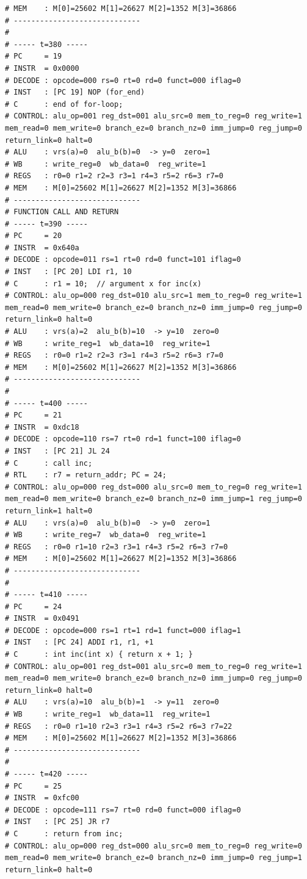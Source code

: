 \documentclass[12pt]{report}
\begin{document}
\begin{lstlisting}
# MEM    : M[0]=25602 M[1]=26627 M[2]=1352 M[3]=36866
# -----------------------------
# 
# ----- t=380 -----
# PC     = 19
# INSTR  = 0x0000
# DECODE : opcode=000 rs=0 rt=0 rd=0 funct=000 iflag=0
# INST   : [PC 19] NOP (for_end)
# C      : end of for-loop;
# CONTROL: alu_op=001 reg_dst=001 alu_src=0 mem_to_reg=0 reg_write=1 mem_read=0 mem_write=0 branch_ez=0 branch_nz=0 imm_jump=0 reg_jump=0 return_link=0 halt=0
# ALU    : vrs(a)=0  alu_b(b)=0  -> y=0  zero=1
# WB     : write_reg=0  wb_data=0  reg_write=1
# REGS   : r0=0 r1=2 r2=3 r3=1 r4=3 r5=2 r6=3 r7=0
# MEM    : M[0]=25602 M[1]=26627 M[2]=1352 M[3]=36866
# -----------------------------
# FUNCTION CALL AND RETURN
# ----- t=390 -----
# PC     = 20
# INSTR  = 0x640a
# DECODE : opcode=011 rs=1 rt=0 rd=0 funct=101 iflag=0
# INST   : [PC 20] LDI r1, 10
# C      : r1 = 10;  // argument x for inc(x)
# CONTROL: alu_op=000 reg_dst=010 alu_src=1 mem_to_reg=0 reg_write=1 mem_read=0 mem_write=0 branch_ez=0 branch_nz=0 imm_jump=0 reg_jump=0 return_link=0 halt=0
# ALU    : vrs(a)=2  alu_b(b)=10  -> y=10  zero=0
# WB     : write_reg=1  wb_data=10  reg_write=1
# REGS   : r0=0 r1=2 r2=3 r3=1 r4=3 r5=2 r6=3 r7=0
# MEM    : M[0]=25602 M[1]=26627 M[2]=1352 M[3]=36866
# -----------------------------
# 
# ----- t=400 -----
# PC     = 21
# INSTR  = 0xdc18
# DECODE : opcode=110 rs=7 rt=0 rd=1 funct=100 iflag=0
# INST   : [PC 21] JL 24
# C      : call inc;
# RTL    : r7 = return_addr; PC = 24;
# CONTROL: alu_op=000 reg_dst=000 alu_src=0 mem_to_reg=0 reg_write=1 mem_read=0 mem_write=0 branch_ez=0 branch_nz=0 imm_jump=1 reg_jump=0 return_link=1 halt=0
# ALU    : vrs(a)=0  alu_b(b)=0  -> y=0  zero=1
# WB     : write_reg=7  wb_data=0  reg_write=1
# REGS   : r0=0 r1=10 r2=3 r3=1 r4=3 r5=2 r6=3 r7=0
# MEM    : M[0]=25602 M[1]=26627 M[2]=1352 M[3]=36866
# -----------------------------
# 
# ----- t=410 -----
# PC     = 24
# INSTR  = 0x0491
# DECODE : opcode=000 rs=1 rt=1 rd=1 funct=000 iflag=1
# INST   : [PC 24] ADDI r1, r1, +1
# C      : int inc(int x) { return x + 1; }
# CONTROL: alu_op=001 reg_dst=001 alu_src=0 mem_to_reg=0 reg_write=1 mem_read=0 mem_write=0 branch_ez=0 branch_nz=0 imm_jump=0 reg_jump=0 return_link=0 halt=0
# ALU    : vrs(a)=10  alu_b(b)=1  -> y=11  zero=0
# WB     : write_reg=1  wb_data=11  reg_write=1
# REGS   : r0=0 r1=10 r2=3 r3=1 r4=3 r5=2 r6=3 r7=22
# MEM    : M[0]=25602 M[1]=26627 M[2]=1352 M[3]=36866
# -----------------------------
# 
# ----- t=420 -----
# PC     = 25
# INSTR  = 0xfc00
# DECODE : opcode=111 rs=7 rt=0 rd=0 funct=000 iflag=0
# INST   : [PC 25] JR r7
# C      : return from inc;
# CONTROL: alu_op=000 reg_dst=000 alu_src=0 mem_to_reg=0 reg_write=0 mem_read=0 mem_write=0 branch_ez=0 branch_nz=0 imm_jump=0 reg_jump=1 return_link=0 halt=0

\end{lstlisting}
\end{document}
